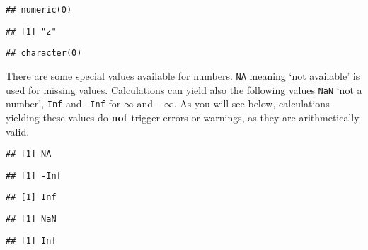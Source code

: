 \documentclass[paper=a4,10pt,div=17,headsepline,BCOR=12mm,twoside,open=right]{scrbook}\usepackage{knitr}
\begin{document}
\begin{knitrout}\footnotesize
{}\color{fgcolor}\begin{kframe}
\begin{alltt}
 \hlkwb{<-} \hlstd{(}\hlstd{)}
\end{alltt}
\begin{verbatim}
## numeric(0)
\end{verbatim}
\begin{alltt}
\hlstd{(}\hlstd{=}\hlstd{)}
\end{alltt}
\begin{verbatim}
## [1] "z"
\end{verbatim}
\begin{alltt}
\hlstd{(}\hlstd{=}\hlstd{)}
\end{alltt}
\begin{verbatim}
## character(0)
\end{verbatim}
\end{kframe}
\end{knitrout}

There are some special values available for numbers. \texttt{NA} meaning `not available' is used for missing values. Calculations can yield also the following values \texttt{NaN} `not a number', \texttt{Inf} and \texttt{-Inf} for $\infty$ and $-\infty$. As you will see below, calculations yielding these values do \textbf{not} trigger errors or warnings, as they are arithmetically valid.

\begin{knitrout}\footnotesize
{}\color{fgcolor}\begin{kframe}
\begin{alltt}
 \hlkwb{<-} 
\end{alltt}
\begin{verbatim}
## [1] NA
\end{verbatim}
\begin{alltt}
\hlopt{-} \hlopt{/} 
\end{alltt}
\begin{verbatim}
## [1] -Inf
\end{verbatim}
\begin{alltt}
 \hlopt{/} 
\end{alltt}
\begin{verbatim}
## [1] Inf
\end{verbatim}
\begin{alltt}
 \hlopt{/} 
\end{alltt}
\begin{verbatim}
## [1] NaN
\end{verbatim}
\begin{alltt}
 \hlopt{+} 
\end{alltt}
\begin{verbatim}
## [1] Inf
\end{verbatim}
\end{kframe}
\end{knitrout}
\end{document}
